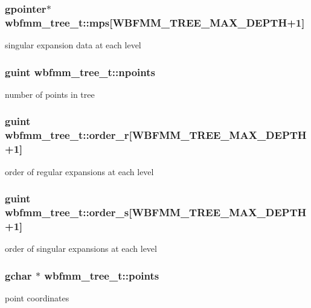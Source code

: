 \subsubsection[{mps}]{\setlength{\rightskip}{0pt plus 5cm}gpointer$\ast$ wbfmm\+\_\+tree\+\_\+t\+::mps[W\+B\+F\+M\+M\+\_\+\+T\+R\+E\+E\+\_\+\+M\+A\+X\+\_\+\+D\+E\+P\+T\+H+1]}\label{structwbfmm__tree__t_aaa852afe822a466d84b51c3fb53b5e7b}
singular expansion data at each level 
\subsubsection[{npoints}]{\setlength{\rightskip}{0pt plus 5cm}guint wbfmm\+\_\+tree\+\_\+t\+::npoints}\label{structwbfmm__tree__t_a05dd3977f0f6f9266dfe5b4de1fd94ea}
number of points in tree 
\subsubsection[{order\+\_\+r}]{\setlength{\rightskip}{0pt plus 5cm}guint wbfmm\+\_\+tree\+\_\+t\+::order\+\_\+r[W\+B\+F\+M\+M\+\_\+\+T\+R\+E\+E\+\_\+\+M\+A\+X\+\_\+\+D\+E\+P\+T\+H+1]}\label{structwbfmm__tree__t_a3977c9974da5fbeaa66a9b1eea6fd235}
order of regular expansions at each level 
\subsubsection[{order\+\_\+s}]{\setlength{\rightskip}{0pt plus 5cm}guint wbfmm\+\_\+tree\+\_\+t\+::order\+\_\+s[W\+B\+F\+M\+M\+\_\+\+T\+R\+E\+E\+\_\+\+M\+A\+X\+\_\+\+D\+E\+P\+T\+H+1]}\label{structwbfmm__tree__t_a4dcb4eecb4b78afa20215a391db8ab0e}
order of singular expansions at each level 
\subsubsection[{points}]{\setlength{\rightskip}{0pt plus 5cm}gchar $\ast$ wbfmm\+\_\+tree\+\_\+t\+::points}\label{structwbfmm__tree__t_a82a6af6a6d054522a860e1a536f6a105}
point coordinates 
